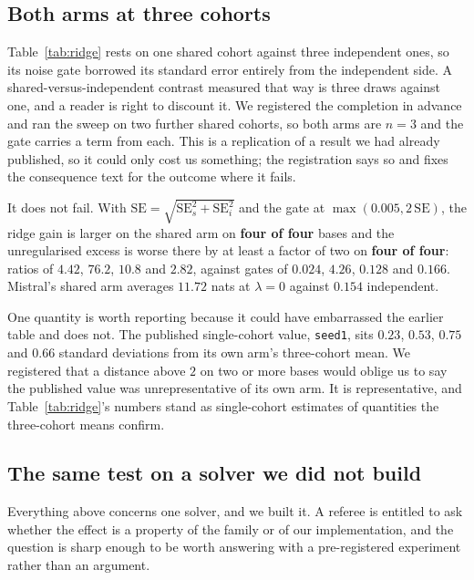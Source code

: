 \subsection{Both arms at three cohorts}
\label{subsec:shared-arm}

Table~\ref{tab:ridge} rests on one shared cohort against three independent
ones, so its noise gate borrowed its standard error entirely from the
independent side. A shared-versus-independent contrast measured that way is
three draws against one, and a reader is right to discount it. We registered
the completion in advance and ran the sweep on two further shared cohorts, so
both arms are $n = 3$ and the gate carries a term from each. This is a
replication of a result we had already published, so it could only cost us
something; the registration says so and fixes the consequence text for the
outcome where it fails.

It does not fail. With
$\mathrm{SE} = \sqrt{\mathrm{SE}_s^2 + \mathrm{SE}_i^2}$ and the gate at
$\max(0.005, 2\,\mathrm{SE})$, the ridge gain is larger on the shared arm on
\textbf{four of four} bases and the unregularised excess is worse there by at
least a factor of two on \textbf{four of four}: ratios of $4.42$, $76.2$,
$10.8$ and $2.82$, against gates of $0.024$, $4.26$, $0.128$ and $0.166$.
Mistral's shared arm averages $11.72$ nats at $\lambda = 0$ against $0.154$
independent.

One quantity is worth reporting because it could have embarrassed the earlier
table and does not. The published single-cohort value, \texttt{seed1}, sits
$0.23$, $0.53$, $0.75$ and $0.66$ standard deviations from its own arm's
three-cohort mean. We registered that a distance above $2$ on two or more
bases would oblige us to say the published value was unrepresentative of its
own arm. It is representative, and Table~\ref{tab:ridge}'s numbers stand as
single-cohort estimates of quantities the three-cohort means confirm.

\subsection{The same test on a solver we did not build}
\label{subsec:regmean}

Everything above concerns one solver, and we built it. A referee is
entitled to ask whether the effect is a property of the family or of our
implementation, and the question is sharp enough to be worth answering
with a pre-registered experiment rather than an argument.

